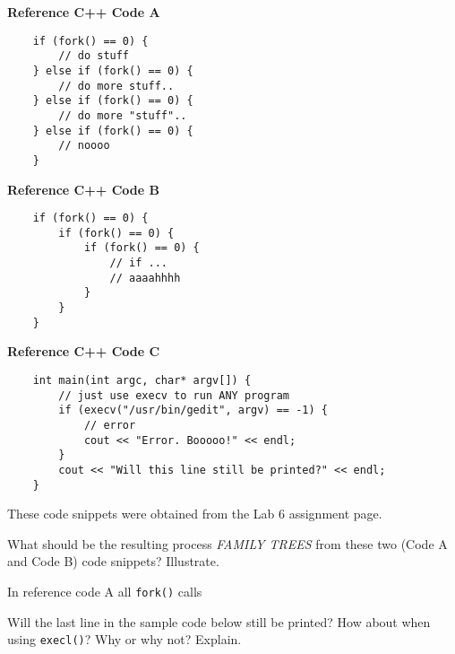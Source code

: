 \documentclass{article}
\begin{document}
{\Large \textbf{Reference C++ Code A}}
\begin{verbatim}
    if (fork() == 0) {
        // do stuff
    } else if (fork() == 0) {
        // do more stuff..
    } else if (fork() == 0) {
        // do more "stuff"..
    } else if (fork() == 0) {
        // noooo
    }
\end{verbatim}

{\Large \textbf{Reference C++ Code B}}
\begin{verbatim}
    if (fork() == 0) {
        if (fork() == 0) {
            if (fork() == 0) {
                // if ...
                // aaaahhhh
            }
        }
    }
\end{verbatim}

{\Large \textbf{Reference C++ Code C}}
\begin{verbatim}
    int main(int argc, char* argv[]) {
        // just use execv to run ANY program
        if (execv("/usr/bin/gedit", argv) == -1) {
            // error
            cout << "Error. Booooo!" << endl;
        }
        cout << "Will this line still be printed?" << endl;
    }
\end{verbatim}

These code snippets were obtained from the Lab 6 assignment page.

\vfill
\newpage

\begin{enumerate}
    {\large \item What should be the resulting process \emph{FAMILY TREES} from these two (Code A and Code B) code snippets? Illustrate.}
    
    In reference code A all \texttt{fork()} calls 
    {\large \item Will the last line in the sample code below still be printed? How about when using \texttt{execl()}? Why or why not? Explain.}
\end{enumerate}
\end{document}
